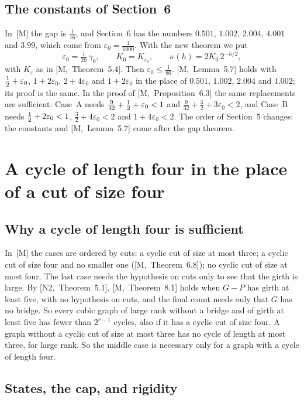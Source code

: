 \documentclass[11pt]{article}
\newcommand{\M}[1]{[M,~#1]}
\newcommand{\NN}[1]{[N2,~#1]}
\begin{document}
\subsection{The constants of Section~6}\label{sec:constants}

In~[M] the gap is $\frac1{16}$, and Section~6 has the numbers $0.501$, $1.002$, $2.004$,
$4.001$ and $3.99$, which come from $\varepsilon_0=\frac1{1000}$. With the new theorem we put
\[
  \varepsilon_0=\tfrac1{20}\,\gamma_0,\qquad K_0=K_{\varepsilon_0},\qquad\kappa(h)=2K_0\,2^{-h/2},
\]
with $K_\varepsilon$ as in \M{Theorem~5.4}. Then $\varepsilon_0\le\frac1{80}$. \M{Lemma~5.7} holds
with $\tfrac12+\varepsilon_0$, $1+2\varepsilon_0$, $2+4\varepsilon_0$ and $1+2\varepsilon_0$ in the
place of $0.501$, $1.002$, $2.004$ and $1.002$; its proof is the same. In the proof of
\M{Proposition~6.3} the same replacements are sufficient: Case~A needs
$\frac9{32}+\tfrac12+\varepsilon_0<1$ and $\frac9{32}+\frac32+3\varepsilon_0<2$, and Case~B needs
$\tfrac12+2\varepsilon_0<1$, $\frac32+4\varepsilon_0<2$ and $1+4\varepsilon_0<2$. The order of
Section~5 changes: the constants and \M{Lemma~5.7} come after the gap theorem.

\section{A cycle of length four in the place of a cut of size four}\label{sec:fourcycle}

\subsection{Why a cycle of length four is sufficient}

In~[M] the cases are ordered by cuts: a cyclic cut of size at most three; a cyclic cut of size
four and no smaller one (\M{Theorem~6.8}); no cyclic cut of size at most four. The last case
needs the hypothesis on cuts only to see that the girth is large. By \NN{Theorem~5.1},
\M{Theorem~8.1} holds when $G-P$ has girth at least five, with no hypothesis on cuts, and the
final count needs only that $G$ has no bridge. So every cubic graph of large rank without a
bridge and of girth at least five has fewer than $2^{r-1}$ cycles, also if it has a cyclic cut of
size four. A graph without a cyclic cut of size at most three has no cycle of length at most
three, for large rank. So the middle case is necessary only for a graph with a cycle of length
four.

\subsection{States, the cap, and rigidity}
\end{document}

